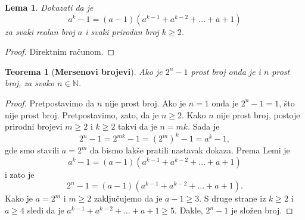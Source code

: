 \documentclass[12pt, a4paper]{article}
\newtheorem*{theorem*}{Teorema}
\newtheorem*{lemma*}{Lema}
\begin{document}
    \begin{lemma*}
        Dokazati da je 
        \[
            a^k - 1 = (a - 1)(a^{k-1} + a^{k-2} + \ldots + a + 1)
        \]
        za svaki realan broj $a$ i svaki prirodan broj $k \geq 2$.
    \end{lemma*}
    \begin{proof}
        Direktnim ra\v{c}unom.
    \end{proof}

    \begin{theorem*}[\textbf{Mersenovi brojevi}]
        Ako je $2^n - 1$ prost broj onda je i $n$ prost broj, za svako $n \in \mathbb{N}$.
    \end{theorem*}
    \begin{proof}
        Pretpostavimo da $n$ nije prost broj. Ako je $n = 1$ onda je $2^n - 1 = 1$, \v{s}to nije 
        prost broj. Pretpostavimo, zato, da je $n \geq 2$. Kako $n$ nije prost broj, postoje prirodni
        brojevi $m \geq 2$ i $k \geq 2$ takvi da je $n = mk$. Sada je 
        \[
            2^n - 1 = 2^{mk} - 1 = (2^m)^k - 1 = a^k - 1,
        \]
        gde smo stavili $a = 2^m$ da bismo lak\v{s}e pratili nastavak dokaza. Prema Lemi je
        \[
            a^k - 1 = (a - 1)(a^{k-1} + a^{k-2} + \ldots + a + 1)
        \]
        i zato je 
        \[
            2^n - 1 = (a - 1)(a^{k-1} + a^{k-2} + \ldots + a + 1).
        \]
        Kako je $a = 2^m$ i $m \geq 2$ zaklju\v{c}ujemo da je $a-1 \geq 3$. S druge strane iz
        $k \geq 2$ i $a \geq 4$ sledi da je $a^{k-1} + a^{k-2} + \ldots + a + 1 \geq 5$. Dakle,
        $2^n - 1$ je slo\v{z}en broj.


    \end{proof}
\end{document}
